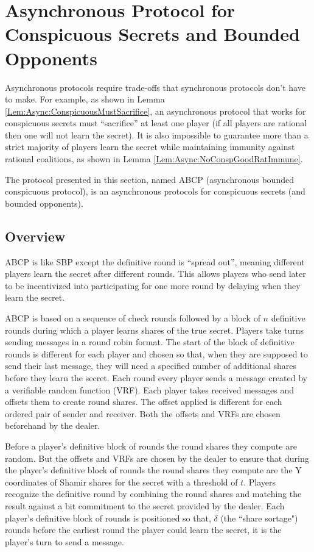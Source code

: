\documentclass{dalcsthesis}
\begin{document}
\section{Asynchronous Protocol for Conspicuous Secrets and Bounded Opponents}

Asynchronous protocols require trade-offs that synchronous protocols don't have to make. For example, as shown in Lemma \ref{Lem:Async:ConspicuousMustSacrifice}, an asynchronous protocol that works for conspicuous secrets must ``sacrifice'' at least one player (if all players are rational then one will not learn the secret). It is also impossible to guarantee more than a strict majority of players learn the secret while maintaining immunity against rational coalitions, as shown in Lemma \ref{Lem:Async:NoConspGoodRatImmune}.

The protocol presented in this section, named ABCP (asynchronous bounded conspicuous protocol), is an asynchronous protocols for conspicuous secrets (and bounded opponents).

\subsection{Overview}

ABCP is like SBP except the definitive round is ``spread out'', meaning different players learn the secret after different rounds. This allows players who send later to be incentivized into participating for one more round by delaying when they learn the secret.
 
ABCP is based on a sequence of check rounds followed by a block of $n$ definitive rounds during which a player learns shares of the true secret. Players take turns sending messages in a round robin format. The start of the block of definitive rounds is different for each player and chosen so that, when they are supposed to send their last message, they will need a specified number of additional shares before they learn the secret. Each round every player sends a message created by a verifiable random function (VRF). Each player takes received messages and offsets them to create round shares. The offset applied is different for each ordered pair of sender and receiver. Both the offsets and VRFs are chosen beforehand by the dealer.

Before a player's definitive block of rounds the round shares they compute are random. But the offsets and VRFs are chosen by the dealer to ensure that during the player's definitive block of rounds the round shares they compute are the Y coordinates of Shamir shares for the secret with a threshold of $t$. Players recognize the definitive round by combining the round shares and matching the result against a bit commitment to the secret provided by the dealer. Each player's definitive block of rounds is positioned so that, $\delta$ (the ``share sortage") rounds before the earliest round the player could learn the secret, it is the player's turn to send a message.
\end{document}
